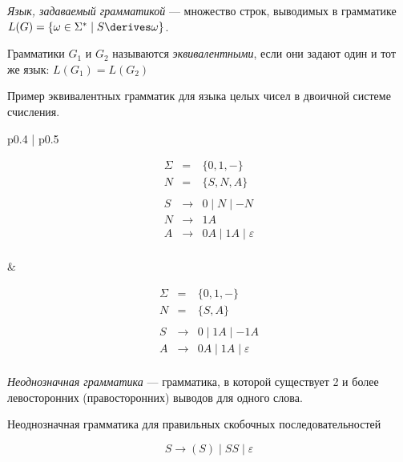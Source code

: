 \begin{definition}
\textit{Язык, задаваемый грамматикой} --- множество строк, выводимых в грамматике $L(G) = \{ \omega \in \Sigma^* \mid S \derives \omega \}$.
\end{definition}

\begin{definition}
  Грамматики $G_1$ и $G_2$ называются \textit{эквивалентными}, если они задают один и тот же язык: $L(G_1) = L(G_2)$
\end{definition}


\begin{example}  Пример эквивалентных грамматик для языка целых чисел в двоичной системе счисления.

  \begin{tabular}{p{} | p{}}

    \[
      \begin{array}{rcl}
      \Sigma &=& \{ 0, 1, - \} \\
      N &=& \{ S, N, A \} \\~\\
      S& \rightarrow & 0 \mid N \mid - N  \\
      N& \rightarrow & 1 A \\
      A& \rightarrow & 0 A \mid 1 A  \mid \varepsilon\\
      \end{array}
    \]

    &

    \[
      \begin{array}{rcl}
      \Sigma &=& \{ 0, 1, - \} \\
      N &=& \{ S, A \} \\~\\
      S& \rightarrow & 0 \mid 1 A  \mid - 1 A  \\
      A& \rightarrow &  0 A \mid 1 A  \mid \varepsilon\\
      \end{array}
    \]
    \end{tabular}

\end{example}


\begin{definition}
  \textit{Неоднозначная грамматика} --- грамматика, в которой существует 2 и более левосторонних (правосторонних) выводов для одного слова.
\end{definition}

\begin{example}
  Неоднозначная грамматика для правильных скобочных последовательностей

\[
    S \to (S) \mid S S \mid \varepsilon
\]
\end{example}

